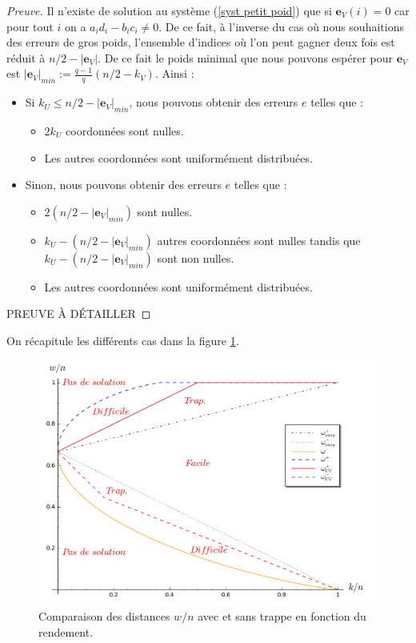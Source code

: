 \documentclass[12pt]{article}
\theoremstyle{plain}
\newcommand{\e}{\mathbf{e}}
\begin{document}
\begin{proof}[Preuve]
Il n'existe de solution au système (\ref{syst petit poid}) que si $\e_V(i)=0$ car pour tout $i$ on a $a_id_i -b_ic_i \neq 0$. De ce fait, à l'inverse du cas où nous souhaitions des erreurs de gros poids, l'ensemble d'indices où l'on peut gagner deux fois est réduit à $n/2 - |\e_V|$. De ce fait le poids minimal que nous pouvons espérer pour $\e_V$ est $|\e_V|_{min} := \frac{q-1}{q}(n/2-k_V)$. Ainsi :
\begin{itemize}
\item Si $k_U \leq n/2 - |\e_V|_{min}$, nous pouvons obtenir des erreurs $e$ telles que :
	\begin{itemize}
	\item $2k_U$ coordonnées sont nulles.
	\item Les autres coordonnées sont uniformément distribuées.
	\end{itemize}
\item Sinon, nous pouvons obtenir des erreurs $e$ telles que :
	\begin{itemize}
	\item $2(n/2 - |\e_V|_{min})$ sont nulles.
	\item $k_U - (n/2 - |\e_V|_{min})$ autres coordonnées sont nulles tandis que $k_U - (n/2 - |\e_V|_{min})$ sont non nulles.
	\item Les autres coordonnées sont uniformément distribuées.
	\end{itemize}
\end{itemize} 
PREUVE À DÉTAILLER
\end{proof}

\noindent On récapitule les différents cas dans la figure \ref{graphique ratio}. \\

\begin{figure}[h]
\begin{center}
\includegraphics [scale=0.4]{include/graph_ratio_w.png}
\end{center}
\caption{\small Comparaison des distances $w/n$ avec et sans trappe en fonction du rendement.}
\label{graphique ratio}
\end{figure}
\end{document}
